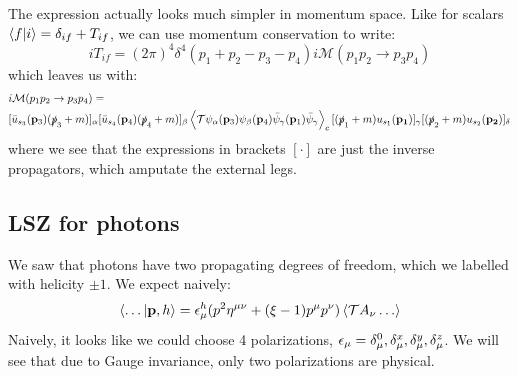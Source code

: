 The expression actually looks much simpler in momentum space. Like for scalars $\langle f \lvert i \rangle = \delta_{if} + T_{if}$, we can use momentum conservation to write:
\begin{equation}
    iT_{if} = (2\pi)^4\delta^4(p_1 + p_2 - p_3 - p_4)i\mathcal{M}(p_1p_2 \to p_3p_4)
\end{equation}
which leaves us with:
\begin{equation}
    \begin{split}
        &i\mathcal{M}(p_1p_2 \to p_3p_4) = 
        \\ &[\bar{u}_{s_3}(\mathbf{p}_3)(\slashed{p}_3 + m)]_\alpha [\bar{u}_{s_4}(\mathbf{p}_4)(\slashed{p}_4 + m)]_\beta \left< \mathcal{T}\psi_{\alpha}(\mathbf{p}_3)\psi_{\beta}(\mathbf{p}_4)\bar{\psi}_\gamma(\mathbf{p}_1)\bar{\psi}_\gamma \right>_c [(\slashed{p}_1 + m)u_{s_1}(\mathbf{p_1})]_\gamma[(\slashed{p}_2 + m)u_{s_2}(\mathbf{p_2})]_\delta
    \end{split}
\end{equation}
where we see that the expressions in brackets $[\cdot]$ are just the inverse propagators, which amputate the external legs.

\subsection{LSZ for photons}
We saw that photons have two propagating degrees of freedom, which we labelled with helicity $\pm 1$. We expect naively:
\begin{equation}
    \langle \ldots \lvert \mathbf{p}, h \rangle = \epsilon^h_\mu (p^2\eta^{\mu\nu} + (\xi - 1)p^\mu p^\nu)\left< \mathcal{T}A_\nu\ldots \right>
\end{equation}
Naively, it looks like we could choose 4 polarizations, $\epsilon_\mu = \delta_\mu^0, \delta^x_\mu, \delta^y_\mu, \delta^z_\mu$. We will see that due to Gauge invariance, only two polarizations are physical.

